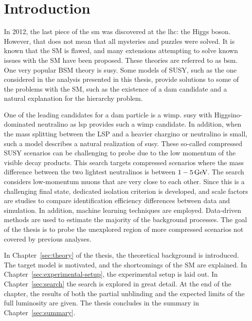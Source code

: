 \chapter{Introduction}

In 2012, the last piece of the \gls{sm} was discovered at the \gls{lhc}: the Higgs boson. However, that does not mean that all mysteries and puzzles were solved. It is known that the SM is flawed, and many extensions attempting to solve known issues with the SM have been proposed. These theories are referred to as \gls{bsm}. One very popular BSM theory is \gls{susy}. Some models of SUSY, such as the one considered in the analysis presented in this thesis, provide solutions to some of the problems with the SM, such as the existence of a \gls{dam} candidate and a natural explanation for the hierarchy problem.

One of the leading candidates for a \gls{dam} particle is a \gls{wimp}. \gls{susy} with Higgsino-dominated neutralino as \gls{lsp} provides such a \gls{wimp} candidate. In addition, when the mass splitting between the LSP and a heavier chargino or neutralino is small, such a model describes a natural realization of \gls{susy}. These so-called compressed SUSY scenarios can be challenging to probe due to the low momentum of the visible decay products. This search targets compressed scenarios where the mass difference between the two lightest neutralinos is between $1-5\,\text{Ge\hspace{-.08em}V}$. The search considers low-momentum muons that are very close to each other. Since this is a challenging final state, dedicated isolation criterion is developed, and scale factors are studies to compare identification efficiency differences between data and simulation. In addition, machine learning techniques are employed. Data-driven methods are used to estimate the majority of the background processes. The goal of the thesis is to probe the unexplored region of more compressed scenarios not covered by previous analyses.

In Chapter~\ref{sec:theory} of the thesis, the theoretical background is introduced. The target model is motivated, and the shortcomings of the SM are explained. In Chapter~\ref{sec:experimental-setup}, the experimental setup is laid out. In Chapter~\ref{sec:search} the search is explored in great detail. At the end of the chapter, the results of both the partial unblinding and the expected limits of the full luminosity are given. The thesis concludes in the summary in Chapter~\ref{sec:summary}.